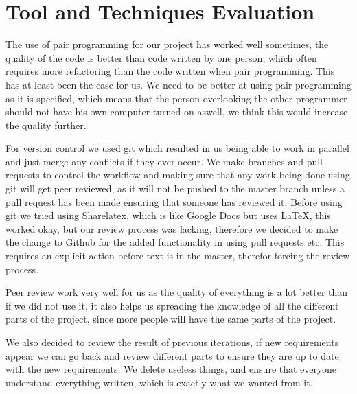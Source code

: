 \section{Tool and Techniques Evaluation}

The use of pair programming for our project has worked well sometimes, the quality of the code is better than code written by one person, which often requires more refactoring than the code written when pair programming.
This has at least been the case for us. 
We need to be better at using pair programming as it is specified, which means that the person overlooking the other programmer should not have his own computer turned on aswell, we think this would increase the quality further. 

For version control we used git which resulted in us being able to work in parallel and just merge any conflicts if they ever occur.
We make branches and pull requests to control the workflow and making sure that any work being done using git will get peer reviewed, as it will not be pushed to the master branch unless a pull request has been made ensuring that someone has reviewed it.
Before using git we tried using Sharelatex, which is like Google Docs but uses \LaTeX, this worked okay, but our review process was lacking, therefore we decided to make the change to Github for the added functionality in using pull requests etc. 
This requires an explicit action before text is in the master, therefor forcing the review process. 

Peer review work very well for us as the quality of everything is a lot better than if we did not use it, it also helps us spreading the knowledge of all the different parts of the project, since more people will have the same parts of the project.

We also decided to review the result of previous iterations, if new requirements appear we can go back and review different parts to ensure they are up to date with the new requirements.
We delete useless things, and ensure that everyone understand everything written, which is exactly what we wanted from it.